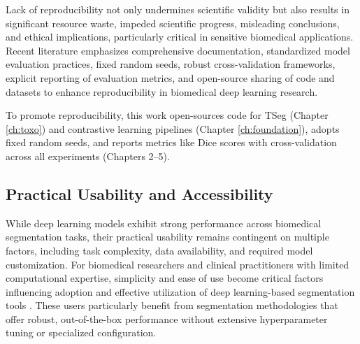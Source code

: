 \documentclass[./dissertation.tex]{subfiles}
\begin{document}
Lack of reproducibility not only undermines scientific validity but also results in significant resource waste, impeded scientific progress, misleading conclusions, and ethical implications, particularly critical in sensitive biomedical applications. Recent literature emphasizes comprehensive documentation, standardized model evaluation practices, fixed random seeds, robust cross-validation frameworks, explicit reporting of evaluation metrics, and open-source sharing of code and datasets to enhance reproducibility in biomedical deep learning research.

To promote reproducibility, this work open-sources code for TSeg (Chapter \ref{ch:toxo}) and contrastive learning pipelines (Chapter \ref{ch:foundation}), adopts fixed random seeds, and reports metrics like Dice scores with cross-validation across all experiments (Chapters 2–5).



\subsection{Practical Usability and Accessibility}
While deep learning models exhibit strong performance across biomedical segmentation tasks, their practical usability remains contingent on multiple factors, including task complexity, data availability, and required model customization. For biomedical researchers and clinical practitioners with limited computational expertise, simplicity and ease of use become critical factors influencing adoption and effective utilization of deep learning-based segmentation tools \cite{wang2021annotation}. These users particularly benefit from segmentation methodologies that offer robust, out-of-the-box performance without extensive hyperparameter tuning or specialized configuration.
\end{document}
